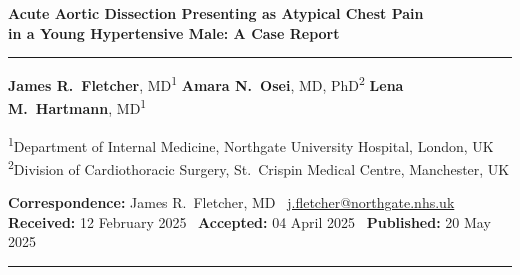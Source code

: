 \documentclass[11pt,a4paper]{article}
\begin{document}
\thispagestyle{plain}

{\centering
\vspace*{4mm}
{\LARGE\bfseries\color{neutral}
Acute Aortic Dissection Presenting as Atypical Chest Pain\\
in a Young Hypertensive Male: A Case Report\par}

\vspace{6pt}
\textcolor{rule}{\rule{0.5\linewidth}{1pt}}
\vspace{8pt}

{\normalsize
\textbf{James R.\ Fletcher}, MD\textsuperscript{1}\quad
\textbf{Amara N.\ Osei}, MD, PhD\textsuperscript{2}\quad
\textbf{Lena M.\ Hartmann}, MD\textsuperscript{1}
\par}

\vspace{4pt}
{\small\color{neutral}
\textsuperscript{1}Department of Internal Medicine, Northgate University Hospital, London, UK\\
\textsuperscript{2}Division of Cardiothoracic Surgery, St.\ Crispin Medical Centre, Manchester, UK
\par}

\vspace{4pt}
{\small\color{neutral}
\textbf{Correspondence:} James R.\ Fletcher, MD \textbullet\
\href{mailto:j.fletcher@northgate.nhs.uk}{j.fletcher@northgate.nhs.uk}\\
\textbf{Received:} 12 February 2025 \textbullet\
\textbf{Accepted:} 04 April 2025 \textbullet\
\textbf{Published:} 20 May 2025
\par}

\vspace{8pt}
\textcolor{rule}{\rule{\linewidth}{0.8pt}}
\vspace{4pt}
}%
\end{document}
